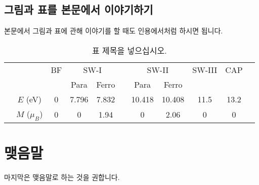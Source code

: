 \documentclass[doctor,korean,final]{kmu}
\begin{document}
\section{그림과 표를 본문에서 이야기하기}

본문에서 그림과 표에 관해 이야기를 할 때도 인용에서처럼 하시면 됩니다.

\begin{table}[t]
\caption{표 제목을 넣으십시오.
}
\label{mag-tab1}
\begin{center}
\begin{tabular} {ccccccccccc}
\hline\hline
& & BF &\multicolumn{2}{c}{SW-I}&&\multicolumn{2}{c}{SW-II}&SW-III&CAP&\\
\cline{4-5} \cline{7-8}
&               &   &  Para & Ferro &&   Para &  Ferro &      &      &\\
\hline
& $E$ (eV)      & 0 & 7.796 & 7.832 && 10.418 & 10.408 & 11.5 & 13.2 &\\
& $M$ ($\mu_B$) & 0 &     0 &  1.94 &&      0 &   2.06 &    0 &    0 &\\
\hline\hline
\end{tabular}
\end{center}
\end{table}



\chapter{맺음말}

마지막은 맺음말로 하는 것을 권합니다.
\end{document}
